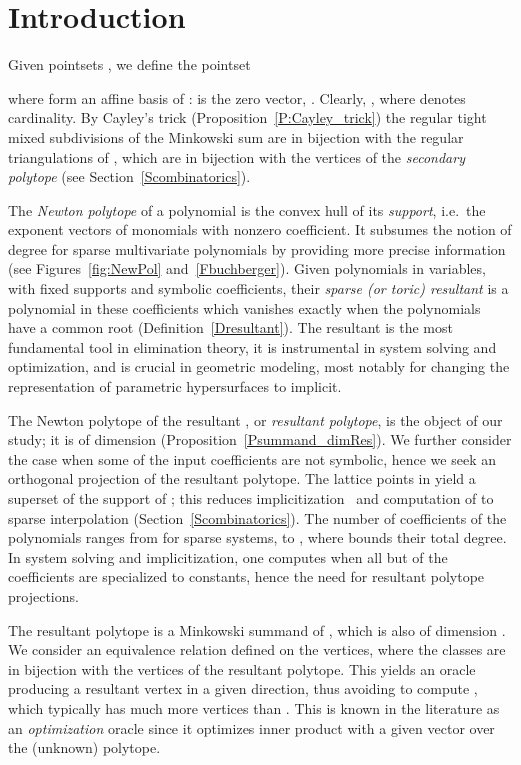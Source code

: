 \documentclass{article}
\begin{document}
\section{Introduction}

Given pointsets , we define the pointset

where  form an affine basis of :
 is the zero vector,\linebreak
.
Clearly, , where  denotes cardinality.
By Cayley's trick (Proposition~\ref{P:Cayley_trick}) the
regular tight mixed subdivisions of the Mink\-owski sum   
are in bijection with the regular triangulations of , which
are in bijection with the vertices of the {\em secondary polytope} 
(see Section~\ref{Scombinatorics}).

The {\em Newton polytope} of a polynomial is 
the convex hull of its {\em support}, i.e.\
the exponent vectors of monomials with nonzero coefficient.
It subsumes the notion of degree for sparse multivariate polynomials by
providing more precise information (see Figures~\ref{fig:NewPol}
and~\ref{Fbuchberger}).
Given  polynomials in  variables, with fixed supports 
and symbolic coefficients, their {\em sparse (or toric) resultant} 
is a polynomial in these coefficients which vanishes exactly when the
polynomials have a common root (Definition~\ref{Dresultant}).
The resultant is the most fundamental tool in elimination theory,
it is instrumental in system solving and optimization, and is crucial
in geometric modeling, most notably for
changing the representation of parametric hypersurfaces to implicit.

The Newton polytope of the resultant , or \textit{resultant polytope},
is the object of our study; it is of dimension 
(Proposition~\ref{Psummand_dimRes}).
We further consider the case when some of the input coefficients are not
symbolic, hence we seek an orthogonal projection of the resultant polytope.
The lattice points in  yield a superset of the support of ;
this reduces implicitization~ and computation of
 to sparse interpolation (Section~\ref{Scombinatorics}).  
The number of coefficients of the  polynomials ranges from 
for sparse systems,
to , where  bounds their total degree.
In system solving and implicitization, one computes  when all but
 of the coefficients are specialized to constants, hence the
need for resultant polytope projections.  

The resultant polytope is a Minkowski summand of ,
which is also of dimension .
We consider an equivalence relation defined on the 
vertices, where the classes are in bijection with the vertices of 
the resultant polytope.
This yields an oracle
producing a resultant vertex in a given direction, thus avoiding to compute
, which typically has much more vertices than .
This is known in the literature as an {\em optimization} oracle since
it optimizes inner product with a given vector over the (unknown) polytope.
\end{document}
